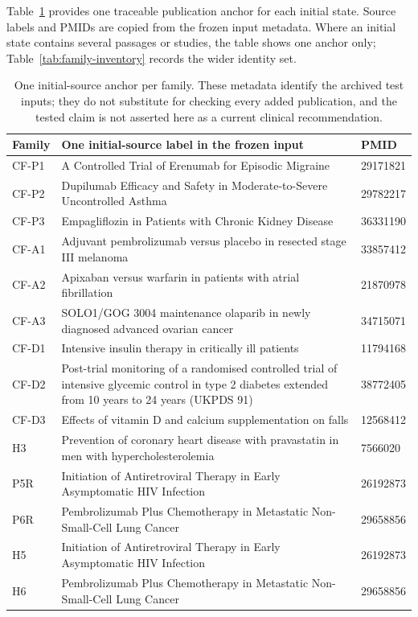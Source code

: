 \documentclass[11pt]{article}
\begin{document}
Table~\ref{tab:initial-source-anchors} provides one traceable publication anchor for each initial state. Source labels and PMIDs are copied from the frozen input metadata. Where an initial state contains several passages or studies, the table shows one anchor only; Table~\ref{tab:family-inventory} records the wider identity set.

\begin{table}[t]
\centering
\footnotesize
\begin{tabularx}{\textwidth}{@{}l X l@{}}
\toprule
Family & One initial-source label in the frozen input & PMID \\
\midrule
CF-P1 & A Controlled Trial of Erenumab for Episodic Migraine & 29171821 \\
CF-P2 & Dupilumab Efficacy and Safety in Moderate-to-Severe Uncontrolled Asthma & 29782217 \\
CF-P3 & Empagliflozin in Patients with Chronic Kidney Disease & 36331190 \\
CF-A1 & Adjuvant pembrolizumab versus placebo in resected stage III melanoma & 33857412 \\
CF-A2 & Apixaban versus warfarin in patients with atrial fibrillation & 21870978 \\
CF-A3 & SOLO1/GOG 3004 maintenance olaparib in newly diagnosed advanced ovarian cancer & 34715071 \\
CF-D1 & Intensive insulin therapy in critically ill patients & 11794168 \\
CF-D2 & Post-trial monitoring of a randomised controlled trial of intensive glycemic control in type 2 diabetes extended from 10 years to 24 years (UKPDS 91) & 38772405 \\
CF-D3 & Effects of vitamin D and calcium supplementation on falls & 12568412 \\
H3 & Prevention of coronary heart disease with pravastatin in men with hypercholesterolemia & 7566020 \\
\midrule
P5R & Initiation of Antiretroviral Therapy in Early Asymptomatic HIV Infection & 26192873 \\
P6R & Pembrolizumab Plus Chemotherapy in Metastatic Non-Small-Cell Lung Cancer & 29658856 \\
H5 & Initiation of Antiretroviral Therapy in Early Asymptomatic HIV Infection & 26192873 \\
H6 & Pembrolizumab Plus Chemotherapy in Metastatic Non-Small-Cell Lung Cancer & 29658856 \\
\bottomrule
\end{tabularx}
\caption{One initial-source anchor per family. These metadata identify the archived test inputs; they do not substitute for checking every added publication, and the tested claim is not asserted here as a current clinical recommendation.}
\label{tab:initial-source-anchors}
\end{table}
\end{document}
